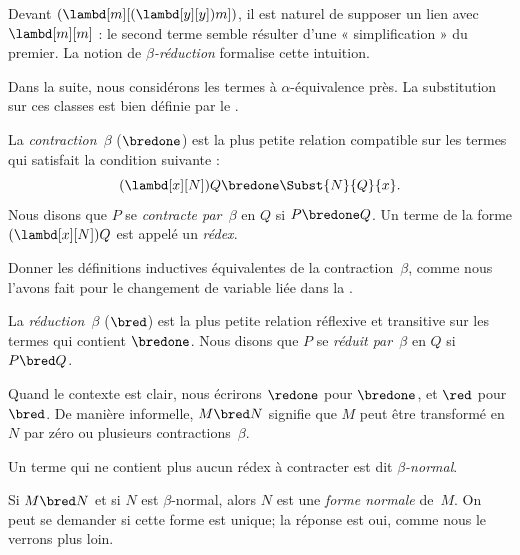 \documentclass[../../../include/open-logic-section]{subfiles}
\begin{document}

Devant $(\lambd[m][(\lambd[y][y]) m])$,
il est naturel de supposer un lien avec
$\lambd[m][m]$ : le second terme semble
résulter d'une « simplification » du premier.
La notion de \emph{$\beta$-réduction}
formalise cette intuition.

Dans la suite, nous considérons les termes à
$\alpha$-équivalence près. La substitution sur
ces classes est bien définie par le
.

\begin{defn}
La \emph{contraction~$\beta$} ($\bredone$)
est la plus petite relation compatible sur
les termes qui satisfait la condition suivante :
\[
  (\lambd[x][N])Q \bredone \Subst{N}{Q}{x}.
\]
Nous disons que $P$ se \emph{contracte par~$\beta$}
en $Q$ si $P \bredone Q$. Un terme de la
forme $(\lambd[x][N])Q$ est appelé un
\emph{rédex}.
\end{defn}

\begin{prob} 
Donner les définitions inductives équivalentes
de la contraction~$\beta$, comme nous l'avons
fait pour le changement de variable liée dans la
.
\end{prob}

\begin{defn}
La \emph{réduction~$\beta$} ($\bred$) est
la plus petite relation réflexive et transitive
sur les termes qui contient $\bredone$.
Nous disons que $P$ se \emph{réduit par~$\beta$}
en $Q$ si $P \bred Q$.
\end{defn}

Quand le contexte est clair, nous écrirons
$\redone$ pour $\bredone$, et $\red$
pour $\bred$. De manière informelle,
$M \bred N$ signifie que $M$ peut être
transformé en $N$ par zéro ou plusieurs
contractions~$\beta$.

\begin{defn}
Un terme qui ne contient plus aucun rédex
à contracter est dit \emph{$\beta$-normal}.
\end{defn}

Si $M \bred N$ et si $N$ est $\beta$-normal,
alors $N$ est une \emph{forme normale} de~$M$.
On peut se demander si cette forme est unique;
la réponse est oui, comme nous le verrons
plus loin.
\end{document}

